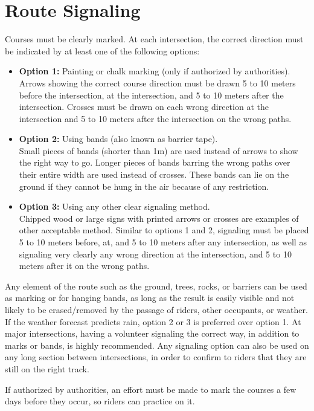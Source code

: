 \section{Route Signaling}
Courses must be clearly marked.
At each intersection, the correct direction must be indicated by at least one of the following options:
\begin{itemize}
\item \textbf{Option 1:} Painting or chalk marking (only if authorized by authorities).\\
Arrows showing the correct course direction must be drawn 5 to 10 meters before the intersection, at the intersection, and 5 to 10 meters after the intersection.
Crosses must be drawn on each wrong direction at the intersection and 5 to 10 meters after the intersection on the wrong paths.
\item \textbf{Option 2:} Using bands (also known as barrier tape).\\
Small pieces of bands (shorter than 1m) are used instead of arrows to show the right way to go.
Longer pieces of bands barring the wrong paths over their entire width are used instead of crosses.
These bands can lie on the ground if they cannot be hung in the air because of any restriction.
\item \textbf{Option 3:} Using any other clear signaling method.\\
Chipped wood or large signs with printed arrows or crosses are examples of other acceptable method.
Similar to options 1 and 2, signaling must be placed 5 to 10 meters before, at, and 5 to 10 meters after any intersection, as well as signaling very clearly any wrong direction at the intersection, and 5 to 10 meters after it on the wrong paths.
\end{itemize}
Any element of the route such as the ground, trees, rocks, or barriers can be used as marking or for hanging bands, as long as the result is easily visible and not likely to be erased/removed by the passage of riders, other occupants, or weather.
If the weather forecast predicts rain, option 2 or 3 is preferred over option 1.
At major intersections, having a volunteer signaling the correct way, in addition to marks or bands, is highly recommended.
Any signaling option can also be used on any long section between intersections, in order to confirm to riders that they are still on the right track.

If authorized by authorities, an effort must be made to mark the courses a few days before they occur, so riders can practice on it.

